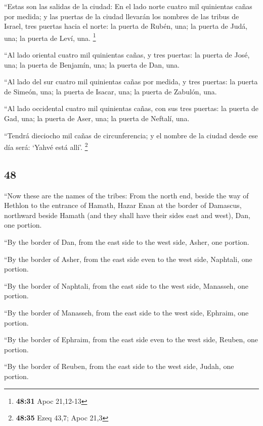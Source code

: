\begin{paracol}{2}
 ``Estas son las salidas de la ciudad: En el lado norte
cuatro mil quinientas cañas por medida;  y las puertas de
la ciudad llevarán los nombres de las tribus de Israel, tres puertas
hacia el norte: la puerta de Rubén, una; la puerta de Judá, una; la
puerta de Leví, una. \footnote{\textbf{48:31} Apoc 21,12-13}

 ``Al lado oriental cuatro mil quinientas cañas, y tres
puertas: la puerta de José, una; la puerta de Benjamín, una; la puerta
de Dan, una.

 ``Al lado del sur cuatro mil quinientas cañas por
medida, y tres puertas: la puerta de Simeón, una; la puerta de Isacar,
una; la puerta de Zabulón, una.

 ``Al lado occidental cuatro mil quinientas cañas, con
sus tres puertas: la puerta de Gad, una; la puerta de Aser, una; la
puerta de Neftalí, una.

 ``Tendrá dieciocho mil cañas de circunferencia; y el
nombre de la ciudad desde ese día será: `Yahvé está allí'. \footnote{\textbf{48:35}
  Ezeq 43,7; Apoc 21,3} \switchcolumn
\begin{otherlanguage}{english}

\hypertarget{section-95}{%
\section{48}\label{section-95}}

 ``Now these are the names of the tribes: From the north
end, beside the way of Hethlon to the entrance of Hamath, Hazar Enan at
the border of Damascus, northward beside Hamath (and they shall have
their sides east and west), Dan, one portion.

 ``By the border of Dan, from the east side to the west
side, Asher, one portion.

 ``By the border of Asher, from the east side even to the
west side, Naphtali, one portion.

 ``By the border of Naphtali, from the east side to the
west side, Manasseh, one portion.

 ``By the border of Manasseh, from the east side to the
west side, Ephraim, one portion.

 ``By the border of Ephraim, from the east side even to
the west side, Reuben, one portion.

 ``By the border of Reuben, from the east side to the west
side, Judah, one portion.


\end{otherlanguage}
\end{paracol}
